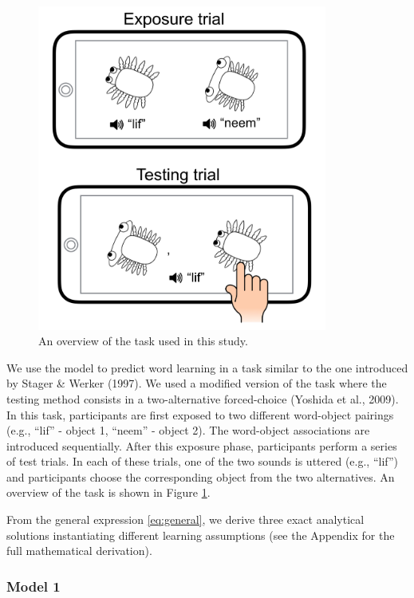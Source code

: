 \documentclass[english,,man]{apa6}
\begin{document}
\begin{figure}[t]

{\centering \includegraphics[width=3.75in]{figs/task} 

}

\caption{An overview of the task used in this study.}\label{fig:task}
\end{figure}

We use the model to predict word learning in a task similar to the one introduced by Stager \& Werker (1997). We used a modified version of the task where the testing method consists in a two-alternative forced-choice (Yoshida et al., 2009). In this task, participants are first exposed to two different word-object pairings (e.g., \enquote{lif} - object 1, \enquote{neem} - object 2). The word-object associations are introduced sequentially. After this exposure phase, participants perform a series of test trials. In each of these trials, one of the two sounds is uttered (e.g., \enquote{lif}) and participants choose the corresponding object from the two alternatives. An overview of the task is shown in Figure \ref{fig:task}.

From the general expression \ref{eq:general}, we derive three exact analytical solutions instantiating different learning assumptions (see the Appendix for the full mathematical derivation).

\hypertarget{model-1}{%
\subsubsection{Model 1}\label{model-1}}
\end{document}
